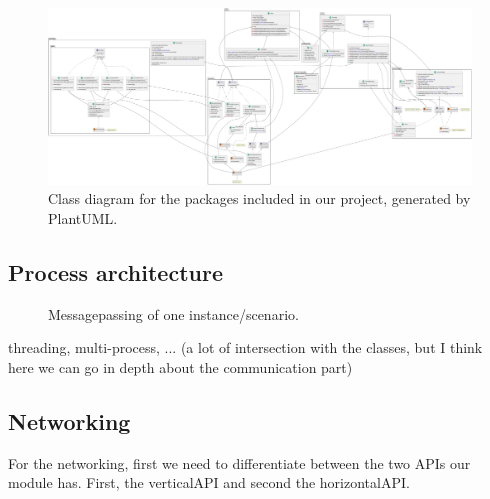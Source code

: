 \documentclass[a4paper,english,10pt,NET]{tumarticle}
\begin{document}
\begin{landscape}
	\pagestyle{empty}
	\begin{figure}
		\centering
		\hspace*{-0.1\linewidth}\includegraphics[width=1.2\linewidth]{figures/class}
		\caption{Class diagram for the packages included in our project, generated by PlantUML.}
		\label{fig:classDia}
	\end{figure}
\end{landscape}

\subsection{Process architecture} \label{sec:msgpassing}


\begin{figure}
	\centering
	
	\caption{Messagepassing of one instance/scenario.}
	\label{fig:msg}
\end{figure}

% 	

threading, multi-process, ... (a lot of intersection with the classes, but I think here we can go in depth about the communication part)

\subsection{Networking} \label{sec:structureNetworking}

For the networking, first we need to differentiate between the two APIs our module has.
First, the verticalAPI and second the horizontalAPI.
\end{document}
